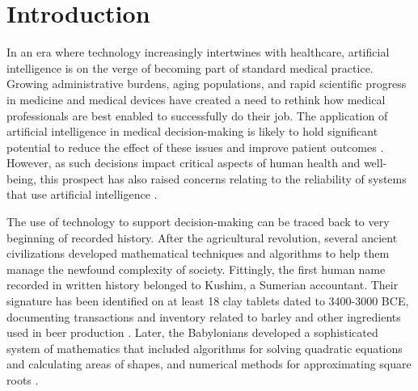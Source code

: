 
\chapter[introduction]{Introduction}\label{chp:introduction}
%
%


In an era where technology increasingly intertwines with healthcare, artificial intelligence is on the verge of becoming part of standard medical practice. 
Growing administrative burdens, aging populations, and rapid scientific progress in medicine and medical devices have created a need to rethink how medical professionals are best enabled to successfully do their job. 
The application of artificial intelligence in medical decision-making is likely to hold significant potential to reduce the effect of these issues and improve patient outcomes \parencite{shailaja_machine_2018}. 
However, as such decisions impact critical aspects of human health and well-being, this prospect has also raised concerns relating to the reliability of systems that use artificial intelligence \parencite{chen_ethical_2021, ahmad_interpretable_2018}.

The use of technology to support decision-making can be traced back to very beginning of recorded history. After the agricultural revolution, several ancient civilizations developed mathematical techniques and algorithms to help them manage the newfound complexity of society. 
Fittingly, the first human name recorded in written history belonged to Kushim, a Sumerian accountant. Their signature has been identified on at least 18 clay tablets dated to 3400-3000 BCE, documenting transactions and inventory related to barley and other ingredients used in beer production \parencite{nissen_archaic_1993}. 
Later, the Babylonians developed a sophisticated system of mathematics that included algorithms for solving quadratic equations and calculating areas of shapes, and numerical methods for approximating square roots \parencite{fowler_square_1998}. 

